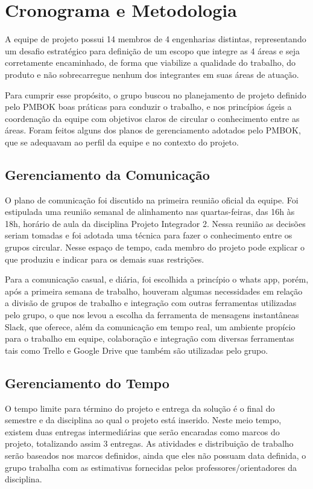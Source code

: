 \section{Cronograma e Metodologia}

A equipe de projeto possui 14 membros de 4 engenharias distintas, representando um desafio estratégico para definição de um escopo que integre as 4 áreas e seja corretamente encaminhado, de forma que viabilize a qualidade do trabalho, do produto e não sobrecarregue nenhum dos integrantes em suas áreas de atuação.

Para cumprir esse propósito, o grupo buscou no planejamento de projeto definido pelo PMBOK boas práticas para conduzir o trabalho, e nos princípios ágeis a coordenação da equipe com objetivos claros de circular o conhecimento entre as áreas. Foram feitos alguns dos planos de gerenciamento adotados pelo PMBOK, que se adequavam ao perfil da equipe e no contexto do projeto.

\subsection{Gerenciamento da Comunicação}

O plano de comunicação foi discutido na primeira reunião oficial da equipe. Foi estipulada uma reunião semanal de alinhamento nas quartas-feiras, das 16h às 18h, horário de aula da disciplina Projeto Integrador 2. Nessa reunião as decisões seriam tomadas e foi adotada uma técnica para fazer o conhecimento entre os grupos circular. Nesse espaço de tempo, cada membro do projeto pode explicar o que produziu e indicar para os demais suas restrições.

Para a comunicação casual, e diária, foi escolhida a princípio o whats app, porém, após a primeira semana de trabalho, houveram algumas necessidades em relação a divisão de grupos de trabalho e integração com outras ferramentas utilizadas pelo grupo, o que nos levou a escolha da ferramenta de mensagens instantâneas Slack, que oferece, além da comunicação em tempo real, um ambiente propício para o trabalho em equipe, colaboração e integração com diversas ferramentas tais como Trello e Google Drive que também são utilizadas pelo grupo.

\subsection{Gerenciamento do Tempo}

O tempo limite para término do projeto e entrega da solução é o final do semestre e da disciplina ao qual o projeto está inserido. Neste meio tempo, existem duas entregas intermediárias que serão encaradas como marcos do projeto, totalizando assim 3 entregas. As atividades e distribuição de trabalho serão baseados nos marcos definidos, ainda que eles não possuam data definida, o grupo trabalha com as estimativas fornecidas pelos professores/orientadores da disciplina.

